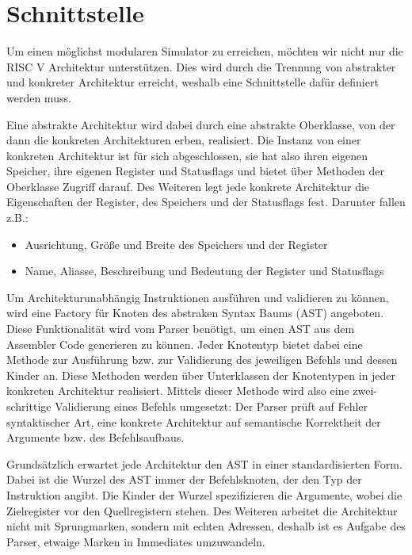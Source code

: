 \section{Schnittstelle}

Um einen möglichst modularen Simulator zu erreichen, möchten wir nicht nur die RISC V Architektur unterstützen. Dies wird durch die Trennung von abstrakter und konkreter Architektur erreicht, weshalb eine Schnittstelle dafür definiert werden muss.

Eine abstrakte Architektur wird dabei durch eine abstrakte Oberklasse, von der dann die konkreten Architekturen erben, realisiert. Die Instanz von einer konkreten Architektur ist für sich abgeschlossen, sie hat also ihren eigenen Speicher, ihre eigenen Register und Statusflags und bietet über Methoden der Oberklasse Zugriff darauf. Des Weiteren legt jede konkrete Architektur die Eigenschaften der Register, des Speichers und der Statusflags fest. Darunter fallen z.B.:

\begin{itemize}
\item Ausrichtung, Größe und Breite des Speichers und der Register
\item Name, Aliasse, Beschreibung und Bedeutung der Register und Statusflags
\end{itemize}

Um Architekturunabhängig Instruktionen ausführen und validieren zu können, wird eine Factory für Knoten des abstraken Syntax Baums (AST) angeboten. Diese Funktionalität wird vom Parser benötigt, um einen AST aus dem Assembler Code generieren zu können. Jeder Knotentyp bietet dabei eine Methode zur Ausführung bzw. zur Validierung des jeweiligen Befehls und dessen Kinder an. Diese Methoden werden über Unterklassen der Knotentypen in jeder konkreten Architektur realisiert. Mittels dieser Methode wird also eine zwei-schrittige Validierung eines Befehls umgesetzt: Der Parser prüft auf Fehler syntaktischer Art, eine konkrete Architektur auf semantische Korrektheit der Argumente bzw. des Befehlsaufbaus.

Grundsätzlich erwartet jede Architektur den AST in einer standardisierten Form. Dabei ist die Wurzel des AST immer der Befehlsknoten, der den Typ der Instruktion angibt. Die Kinder der Wurzel spezifizieren die Argumente, wobei die Zielregister vor den Quellregistern stehen. Des Weiteren arbeitet die Architektur nicht mit Sprungmarken, sondern mit echten Adressen, deshalb ist es Aufgabe des Parser, etwaige Marken in Immediates umzuwandeln.
